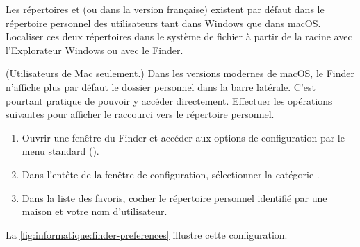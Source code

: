 \begin{exercice}[nosol]
  Les répertoires  et  (ou 
  dans la version française) existent par défaut dans le %
  répertoire
  personnel des utilisateurs tant dans Windows que dans
  macOS. Localiser ces deux répertoires dans le système
  de fichier à partir de la racine avec l'Explorateur Windows ou avec le Finder.
\end{exercice}

\begin{exercice}[nosol]
  (Utilisateurs de Mac seulement.) Dans les versions modernes de
  macOS, le Finder n'affiche plus par
  défaut le dossier personnel dans la barre latérale. C'est pourtant
  pratique de pouvoir y accéder directement. Effectuer les opérations
  suivantes pour afficher le raccourci vers le répertoire personnel.
  \begin{enumerate}[1.]
  \item Ouvrir une fenêtre du Finder et accéder aux options de
    configuration par le menu standard 
    (\code{\cmdkey\,,}).
  \item Dans l'entête de la fenêtre de configuration, sélectionner la
    catégorie .
  \item Dans la liste des favoris, cocher le répertoire personnel
    identifié par une maison et votre nom d'utilisateur.
  \end{enumerate}
  La \autoref{fig:informatique:finder-preferences} illustre cette
  configuration.


\end{exercice}
